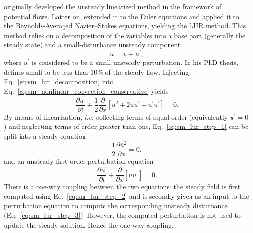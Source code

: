 
\citet{Verdon1984} originally developed the unsteady linearized 
method in the framework of potential flows. Latter on, \citet{Hall1989}
extended it to the Euler equations and
\citet{Clark2000} applied it to the Reynolds-Averaged Navier--Stokes equations,
yielding the LUR method.
This method relies on a decomposition of the variables
into a base part (generally the steady state) 
and a small-disturbance unsteady component
\begin{equation}
	u = \overline{u} + u^\prime,
	\label{eq:sm_lur_decomposition}
\end{equation}
where $u^\prime$ is considered to be a small unsteady perturbation.
In his PhD thesis,
\citet{Hall1987} defines small to be less than $10\%$ of the
steady flow.
Injecting Eq.~\eqref{eq:sm_lur_decomposition} into 
Eq.~\eqref{eq:sm_nonlinear_convection_conservative} yields
\begin{equation}
	\frac{\partial u^\prime}{\partial t} + 
	\frac{1}{2}\frac{\partial}{\partial x} \left[
	\overline{u}^2 + 2 \overline{u} u^\prime + u^\prime u^\prime \right] = 
	0.
	\label{eq:sm_lur_step_1}
\end{equation}
By means of linearization, \emph{i.e.} collecting terms
of equal order (equivalently $\overline{u^\prime} = 0$) 
and neglecting terms of order greater than one, 
Eq.~\eqref{eq:sm_lur_step_1} can be split
into a steady equation
\begin{equation}
	\frac{1}{2} \frac{\partial \overline{u}^2}{\partial x} = 0,
	\label{eq:sm_lur_step_2}
\end{equation}
and an unsteady first-order perturbation equation
\begin{equation}
	\frac{\partial u^\prime}{\partial t} +
	\frac{\partial}{\partial x} \left[
	\overline{u} u^\prime \right] = 
	0.
	\label{eq:sm_lur_step_3}
\end{equation}
There is a one-way coupling between the two equations:
the steady field
is first computed using Eq.~\eqref{eq:sm_lur_step_2}
and is secondly given as an input to the
perturbation equation to compute
the corresponding unsteady disturbance (Eq.~\eqref{eq:sm_lur_step_3}). 
However, the computed
perturbation is not used to update the steady solution.
Hence the one-way coupling.

